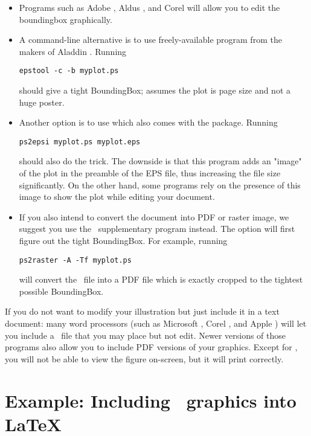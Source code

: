 \begin{itemize}
\item Programs such as Adobe , Aldus
, and Corel  will allow you
to edit the boundingbox graphically.

\item A command-line alternative is to use freely-available
program  from the makers of Aladdin
.  Running
\begin{verbatim}
epstool -c -b myplot.ps
\end{verbatim}
should give a tight BoundingBox;  assumes the plot
is page size and not a huge poster.

\item Another option is to use  which also comes
with the  package.  Running
\begin{verbatim}
ps2epsi myplot.ps myplot.eps
\end{verbatim}
should also do the trick. The downside is that this program adds an "image" of the plot in the preamble of the EPS file, thus increasing the file size significantly. On the other hand, some programs rely on the presence of this image to show the plot while editing your document.

\item If you also intend to convert the document into PDF or raster image, we suggest you use the \GMT\ supplementary program  instead. The  option will first figure out the tight BoundingBox. For example, running
\begin{verbatim}
ps2raster -A -Tf myplot.ps
\end{verbatim}
will convert the \PS\ file  into a PDF file  which is exactly cropped to the tightest possible BoundingBox.
\end{itemize}

If you do not want to modify your illustration but just include it in a text document: many word processors (such
as Microsoft , Corel , and Apple )
will let you include a \PS\ file that you may place but not edit. Newer versions of those programs also allow you to include PDF versions of your graphics. Except for , 
you will not be able to view the figure on-screen, but it will print correctly.

\section{Example: Including \gmt\ graphics into \LaTeX}

